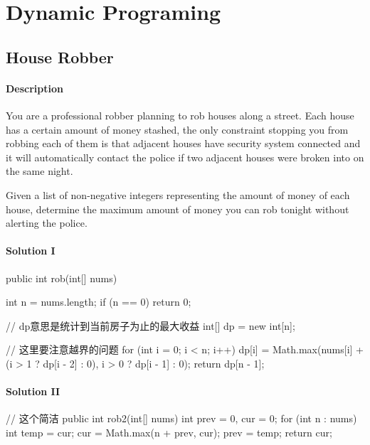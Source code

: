\chapter{Dynamic Programing}

\section{House Robber} %

\subsubsection{Description}
You are a professional robber planning to rob houses along a street. Each house has a certain amount of money stashed, the only constraint stopping you from robbing each of them is that adjacent houses have security system connected and it will automatically contact the police if two adjacent houses were broken into on the same night.

Given a list of non-negative integers representing the amount of money of each house, determine the maximum amount of money you can rob tonight without alerting the police.

\subsubsection{Solution I}

\begin{Code}
public int rob(int[] nums) {
    int n = nums.length;
    if (n == 0) {
        return 0;
    }

    // dp意思是统计到当前房子为止的最大收益
    int[] dp = new int[n];

    // 这里要注意越界的问题
    for (int i = 0; i < n; i++) {
        dp[i] = Math.max(nums[i] + (i > 1 ? dp[i - 2] : 0), i > 0 ? dp[i - 1] : 0);
    }
    return dp[n - 1];
}
\end{Code}

\subsubsection{Solution II}

\begin{Code}
// 这个简洁
public int rob2(int[] nums) {
    int prev = 0, cur = 0;
    for (int n : nums) {
        int temp = cur;
        cur = Math.max(n + prev, cur);
        prev = temp;
    }
    return cur;
}
\end{Code}

